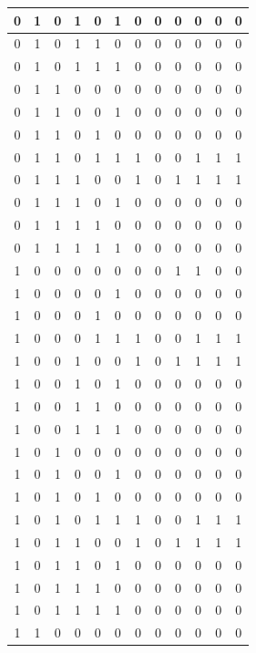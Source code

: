 \documentclass[12pt,a4paper]{article}
\begin{document}
\begin{longtable}{|ccc|ccc||ccc|c|c|c|}
0 & 1 & 0 & 1 & 0 & 1 & 0 & 0 & 0 & 0 & 0 & 0 \\ \hline
0 & 1 & 0 & 1 & 1 & 0 & 0 & 0 & 0 & 0 & 0 & 0 \\ \hline
0 & 1 & 0 & 1 & 1 & 1 & 0 & 0 & 0 & 0 & 0 & 0 \\ \hline
0 & 1 & 1 & 0 & 0 & 0 & 0 & 0 & 0 & 0 & 0 & 0 \\ \hline
0 & 1 & 1 & 0 & 0 & 1 & 0 & 0 & 0 & 0 & 0 & 0 \\ \hline
0 & 1 & 1 & 0 & 1 & 0 & 0 & 0 & 0 & 0 & 0 & 0 \\ \hline
0 & 1 & 1 & 0 & 1 & 1 & 1 & 0 & 0 & 1 & 1 & 1 \\ \hline
0 & 1 & 1 & 1 & 0 & 0 & 1 & 0 & 1 & 1 & 1 & 1 \\ \hline
0 & 1 & 1 & 1 & 0 & 1 & 0 & 0 & 0 & 0 & 0 & 0 \\ \hline
0 & 1 & 1 & 1 & 1 & 0 & 0 & 0 & 0 & 0 & 0 & 0 \\ \hline
0 & 1 & 1 & 1 & 1 & 1 & 0 & 0 & 0 & 0 & 0 & 0 \\ \hline
1 & 0 & 0 & 0 & 0 & 0 & 0 & 0 & 1 & 1 & 0 & 0 \\ \hline
1 & 0 & 0 & 0 & 0 & 1 & 0 & 0 & 0 & 0 & 0 & 0 \\ \hline
1 & 0 & 0 & 0 & 1 & 0 & 0 & 0 & 0 & 0 & 0 & 0 \\ \hline
1 & 0 & 0 & 0 & 1 & 1 & 1 & 0 & 0 & 1 & 1 & 1 \\ \hline
1 & 0 & 0 & 1 & 0 & 0 & 1 & 0 & 1 & 1 & 1 & 1 \\ \hline
1 & 0 & 0 & 1 & 0 & 1 & 0 & 0 & 0 & 0 & 0 & 0 \\ \hline
1 & 0 & 0 & 1 & 1 & 0 & 0 & 0 & 0 & 0 & 0 & 0 \\ \hline
1 & 0 & 0 & 1 & 1 & 1 & 0 & 0 & 0 & 0 & 0 & 0 \\ \hline
1 & 0 & 1 & 0 & 0 & 0 & 0 & 0 & 0 & 0 & 0 & 0 \\ \hline
1 & 0 & 1 & 0 & 0 & 1 & 0 & 0 & 0 & 0 & 0 & 0 \\ \hline
1 & 0 & 1 & 0 & 1 & 0 & 0 & 0 & 0 & 0 & 0 & 0 \\ \hline
1 & 0 & 1 & 0 & 1 & 1 & 1 & 0 & 0 & 1 & 1 & 1 \\ \hline
1 & 0 & 1 & 1 & 0 & 0 & 1 & 0 & 1 & 1 & 1 & 1 \\ \hline
1 & 0 & 1 & 1 & 0 & 1 & 0 & 0 & 0 & 0 & 0 & 0 \\ \hline
1 & 0 & 1 & 1 & 1 & 0 & 0 & 0 & 0 & 0 & 0 & 0 \\ \hline
1 & 0 & 1 & 1 & 1 & 1 & 0 & 0 & 0 & 0 & 0 & 0 \\ \hline
1 & 1 & 0 & 0 & 0 & 0 & 0 & 0 & 0 & 0 & 0 & 0 \\ \hline

\end{longtable}
\end{document}
